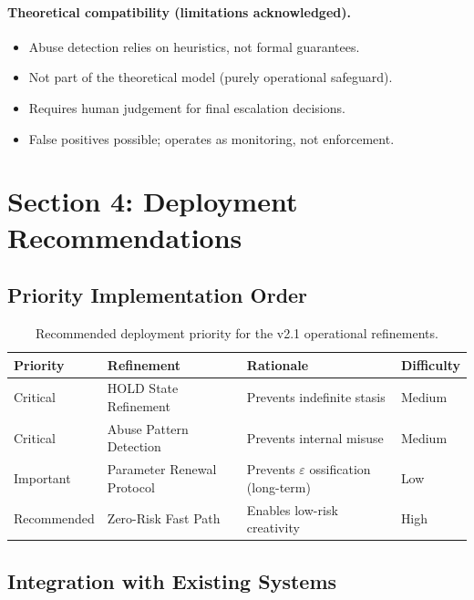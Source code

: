 \clearpage
\paragraph{Theoretical compatibility (limitations acknowledged).}
\begin{itemize}
\item Abuse detection relies on heuristics, not formal guarantees.
\item Not part of the theoretical model (purely operational
safeguard).
\item Requires human judgement for final escalation decisions.
\item False positives possible; operates as monitoring, not
enforcement.
\end{itemize}

\section{Section 4: Deployment Recommendations}
\label{sec:deployment-recommendations}

\subsection{Priority Implementation Order}

\begin{table}[ht]
\centering
\small
\begin{tabularx}{\linewidth}{lXXl}
\toprule
\textbf{Priority} & \textbf{Refinement} & \textbf{Rationale} & \textbf{Difficulty} \\
\midrule
Critical
& HOLD State Refinement
& Prevents indefinite stasis
& Medium \\
Critical
& Abuse Pattern Detection
& Prevents internal misuse
& Medium \\
Important
& Parameter Renewal Protocol
& Prevents $\varepsilon$ ossification (long-term)
& Low \\
Recommended
& Zero-Risk Fast Path
& Enables low-risk creativity
& High \\
\bottomrule
\end{tabularx}
\caption[Deployment priority]{Recommended deployment priority for
the v2.1 operational refinements.}
\label{tab:deployment-priority}
\end{table}

\subsection{Integration with Existing Systems}

